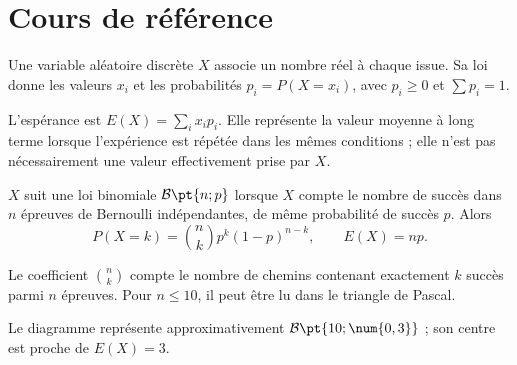 
\section{Cours de référence}
Une variable aléatoire discrète $X$ associe un nombre réel à chaque issue. Sa loi donne les valeurs $x_i$ et les probabilités $p_i=P(X=x_i)$, avec $p_i\geq0$ et $\sum p_i=1$.

\begin{keypoint}
L'espérance est $E(X)=\sum_i x_ip_i$. Elle représente la valeur moyenne à long terme lorsque l'expérience est répétée dans les mêmes conditions ; elle n'est pas nécessairement une valeur effectivement prise par $X$.
\end{keypoint}

\begin{center}
\end{center}

\begin{keypoint}
$X$ suit une loi binomiale $\mathcal B\pt{n;p}$ lorsque $X$ compte le nombre de succès dans $n$ épreuves de Bernoulli indépendantes, de même probabilité de succès $p$. Alors
\[
P(X=k)=\binom nk p^k(1-p)^{n-k},\qquad E(X)=np.
\]
\end{keypoint}

Le coefficient $\binom nk$ compte le nombre de chemins contenant exactement $k$ succès parmi $n$ épreuves. Pour $n\leq10$, il peut être lu dans le triangle de Pascal.

\begin{center}
\end{center}
Le diagramme représente approximativement $\mathcal B\pt{10;\num{0,3}}$ ; son centre est proche de $E(X)=3$.


